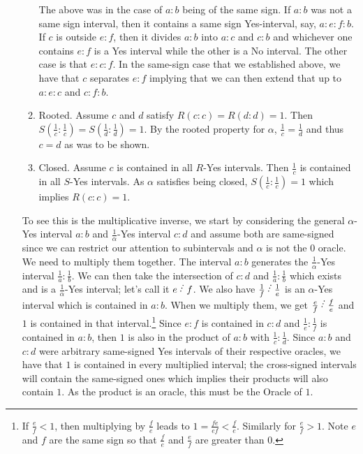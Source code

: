 \documentclass[12pt]{article}
\begin{document}
\begin{itemize}
\begin{enumerate}
        The above was in the case of $a:b$ being of the same sign. If $a:b$ was not a same sign interval, then it contains a same sign Yes-interval, say, $a:e:f:b$. If $c$ is outside $e:f$, then it divides $a:b$ into $a:c$ and $c:b$ and whichever one contains $e:f$ is a Yes interval while the other is a No interval. The other case is that $e:c:f$. In the same-sign case that we established above, we have that $c$ separates $e:f$ implying that we can then extend that up to $a:e:c$ and $c:f:b$.
        \item Rooted. Assume $c$ and $d$ satisfy $R(c:c)=R(d:d)=1$. Then $S(\frac{1}{c}:\frac{1}{c})=S(\frac{1}{d}:\frac{1}{d})=1$. By the rooted property for $\alpha$, $\frac{1}{c} = \frac{1}{d}$ and thus $c=d$ as was to be shown. 
        \item Closed. Assume $c$ is contained in all $R$-Yes intervals. Then $\frac{1}{c}$ is contained in all $S$-Yes intervals. As $\alpha$ satisfies being closed, $S(\frac{1}{c}:\frac{1}{c})=1$ which implies $R(c:c)=1$.
    \end{enumerate}
    
    To see this is the multiplicative inverse, we start by considering the general $\alpha$-Yes interval $a:b$ and $\frac{1}{\alpha}$-Yes interval $c:d$ and assume both are same-signed since we can restrict our attention to subintervals and $\alpha$ is not the 0 oracle. We need to multiply them together. The interval $a:b$ generates the $\frac{1}{\alpha}$-Yes interval $\frac{1}{a}:\frac{1}{b}$. We can then take the intersection of $c:d$ and $\frac{1}{a}:\frac{1}{b}$ which exists and is a $\frac{1}{\alpha}$-Yes interval; let's call it $e\lte f$. We also have $\frac{1}{f} \lte \frac{1}{e}$ is an $\alpha$-Yes interval which is contained in $a:b$. When we multiply them, we get $\frac{e}{f}\lte \frac{f}{e}$ and $1$ is  contained in that interval.\footnote{If $\frac{e}{f} <1$, then multiplying by $\frac{f}{e}$ leads to $1 = \frac{fe}{ef} < \frac{f}{e}$. Similarly for $\frac{e}{f} > 1$. Note $e$ and $f$ are the same sign so that $\frac{f}{e}$ and $\frac{e}{f}$ are greater than 0. } Since $e:f$ is contained in $c:d$ and $\frac{1}{e}:\frac{1}{f}$ is contained in $a:b$, then $1$ is also in the product of $a:b$ with $\frac{1}{c}:\frac{1}{d}$. Since $a:b$ and $c:d$ were arbitrary same-signed Yes intervals of their respective oracles, we have that $1$ is contained in every multiplied interval; the cross-signed intervals will contain the same-signed ones which implies their products will also contain $1$. As the product is an oracle, this must be the Oracle of $1$. 
    
\end{itemize}
\end{document}
